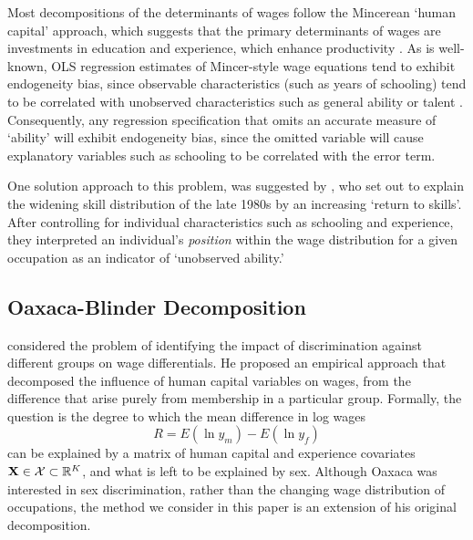 Most decompositions of the determinants of wages follow the Mincerean `human capital' approach, which suggests that the primary determinants of wages are investments in education and experience, which enhance productivity \citep{Mincer1962}. As is well-known, OLS regression estimates of Mincer-style wage equations tend to exhibit endogeneity bias, since observable characteristics (such as years of schooling) tend to be correlated with unobserved characteristics such as general ability or talent \citep{Card1999}. Consequently, any regression specification that omits an accurate measure of `ability' will exhibit endogeneity bias, since the omitted variable will cause explanatory variables such as schooling to be correlated with the error term.

One solution approach to this problem, was suggested by \citet{Juhn1993}, who set out to explain the widening skill distribution of the late 1980s by an increasing `return to skills'. After controlling for individual characteristics such as schooling and experience, they interpreted an individual's {\em position} within the wage distribution for a given occupation as an indicator of `unobserved ability.'




\subsection{Oaxaca-Blinder Decomposition}

\citet{Oaxaca1973} considered the problem of identifying the impact of discrimination against different groups on wage differentials. He proposed an empirical approach that decomposed the influence of human capital variables on wages, from the difference that arise purely from membership in a particular group. Formally, the question is the degree to which the mean difference in log wages 
$$ R = E(\ln y_m) - E(\ln y_f) $$ 
can be explained by a matrix of human capital and experience covariates $\mathbf{X}\in\mathcal{X}\subset\mathbb{R}^K$, and what is left to be explained by sex. Although Oaxaca was interested in sex discrimination, rather than the changing wage distribution of occupations, the method we consider in this paper is an extension of his original decomposition.

